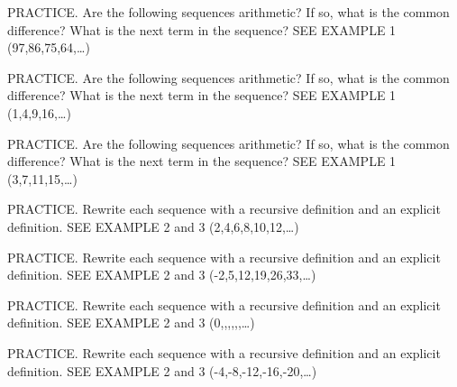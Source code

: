 \documentclass{article}
\newenvironment{practice}[2]{}{}        %
\newcommand{\answer}[1]{}               %
\newcommand{\te}[1]{}                   %
\begin{document}
\begin{practice}{19}{1}
PRACTICE. Are the following sequences arithmetic? If so, what is the common difference? What is the next term in the sequence? SEE EXAMPLE 1
(97,86,75,64,\ldots)
\answer{yes; (-11); 53}
\end{practice}
\begin{practice}{20}{1}
PRACTICE. Are the following sequences arithmetic? If so, what is the common difference? What is the next term in the sequence? SEE EXAMPLE 1
(1,4,9,16,\ldots)
\answer{no}
\end{practice}
\begin{practice}{21}{1}
PRACTICE. Are the following sequences arithmetic? If so, what is the common difference? What is the next term in the sequence? SEE EXAMPLE 1
(3,7,11,15,\ldots)
\answer{yes; 4; 19}
\end{practice}
\begin{practice}{22}{1}
PRACTICE. Rewrite each sequence with a recursive definition and an explicit definition. SEE EXAMPLE 2 and 3
(2,4,6,8,10,12,\ldots)
\answer{(a_n=\begin{cases}2,&\text{if }n=1\\a_{n-1}+2,&\text{if }n>1\end{cases}); (a_n=2+2(n-1)).}
\end{practice}
\begin{practice}{23}{1}
PRACTICE. Rewrite each sequence with a recursive definition and an explicit definition. SEE EXAMPLE 2 and 3
(-2,5,12,19,26,33,\ldots)
\answer{(a_n=\begin{cases}-2,&\text{if }n=1\\a_{n-1}+7,&\text{if }n>1\end{cases}); (a_n=2+7(n-1)).}
\te{Printed explicit definition starts with +2; likely (-2+7(n-1)) to match the sequence and recursive definition.}
\end{practice}
\begin{practice}{24}{1}
PRACTICE. Rewrite each sequence with a recursive definition and an explicit definition. SEE EXAMPLE 2 and 3
(0,,,,,,\ldots)
\answer{(a_n=\begin{cases}0,&\text{if }n=1\\a_{n-1}+\frac18,&\text{if }n>1\end{cases}); (a_n=\frac18(n-1)).}
\end{practice}
\begin{practice}{25}{1}
PRACTICE. Rewrite each sequence with a recursive definition and an explicit definition. SEE EXAMPLE 2 and 3
(-4,-8,-12,-16,-20,\ldots)
\answer{(a_n=\begin{cases}-4,&\text{if }n=1\\a_{n-1}-4,&\text{if }n>1\end{cases}); (a_n=-4-4(n-1)).}
\end{practice}
\end{document}
